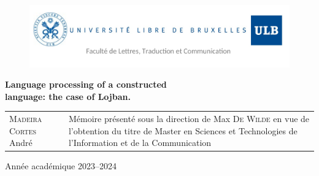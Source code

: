 \begin{titlingpage}

\begin{figure}[H]
\vspace{-2cm}
\hspace{-2.5cm}
\includegraphics[scale=0.30]{images/header.png}
\end{figure}

\vfill

\begin{center}
\hspace{-0.5cm}
\Huge{\textbf{Language processing of a constructed \\language: the case of Lojban.}}\\
\end{center}

\vfill

\begin{tabular}{b{6.5cm}b{7.5cm}}
\textsc{Madeira Cortes} André & Mémoire présenté sous la direction de Max \textsc{De Wilde}
en vue de l'obtention du titre de Master en Sciences et Technologies de l'Information et de la Communication\\
\end{tabular}

\vfill

\begin{center}
\Large Année académique 2023--2024
\end{center}

\end{titlingpage}